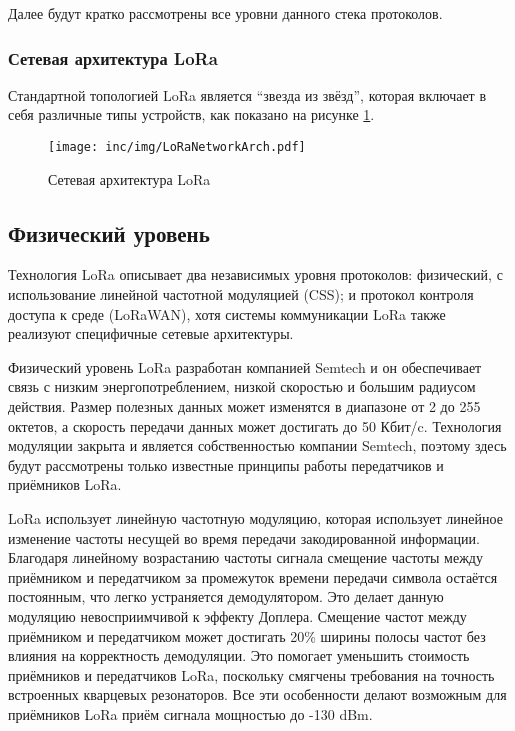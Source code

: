Далее будут кратко рассмотрены все уровни данного стека протоколов.

\subsubsection{Сетевая архитектура LoRa}

Стандартной топологией LoRa является ``звезда из звёзд'', которая включает в себя различные типы устройств, как показано на рисунке \ref{fig:loranetworkarch}.

\begin{figure}[ht]
  \centering
  \texttt{[image: inc/img/LoRaNetworkArch.pdf]}
  \caption{Сетевая архитектура LoRa}
  \label{fig:loranetworkarch}
\end{figure}

\subsection{Физический уровень}

Технология LoRa описывает два независимых уровня протоколов: физический, с использование линейной частотной модуляцией (CSS); и протокол контроля доступа к среде (LoRaWAN), хотя системы коммуникации LoRa также реализуют специфичные сетевые архитектуры\cite{augustin2016}.

Физический уровень LoRa разработан компанией Semtech и он обеспечивает связь с низким энергопотреблением, низкой скоростью и большим радиусом действия.
Размер полезных данных может изменятся в диапазоне от 2 до 255 октетов, а скорость передачи данных может достигать до 50 Кбит/c. 
Технология модуляции закрыта и является собственностью компании Semtech, поэтому здесь будут рассмотрены только известные принципы работы передатчиков и приёмников LoRa.

LoRa использует линейную частотную модуляцию, которая использует линейное изменение частоты несущей во время передачи закодированной информации.
Благодаря линейному возрастанию частоты сигнала смещение частоты между приёмником и передатчиком за промежуток времени передачи символа остаётся постоянным, что легко устраняется демодулятором\cite{augustin2016}. 
Это делает данную модуляцию невосприимчивой к эффекту Доплера.
Смещение частот между приёмником и передатчиком может достигать 20\% ширины полосы частот без влияния на корректность демодуляции.
Это помогает уменьшить стоимость приёмников и передатчиков LoRa, поскольку смягчены требования на точность встроенных кварцевых резонаторов.
Все эти особенности делают возможным для приёмников LoRa приём сигнала мощностью до -130 dBm.

